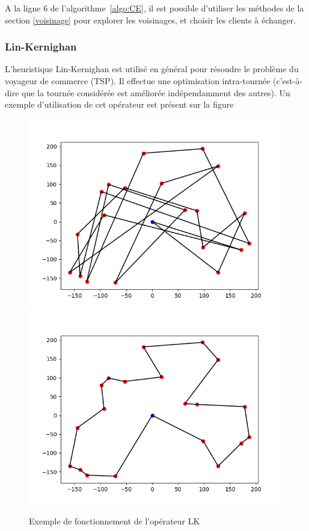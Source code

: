\documentclass[a4paper,11pt]{article}%
\begin{document}
A la ligne $6$ de l'algorithme~\ref{algo:CE}, il est possible d'utiliser les méthodes de la section \ref{voisinage} pour explorer les voisinages, et choisir les clients à échanger.

\subsubsection{Lin-Kernighan}

L'heuristique Lin-Kernighan est utilisé en général pour résoudre le problème du voyageur de commerce (TSP). Il effectue une optimisation intra-tournée (c'est-à-dire que la tournée considérée est améliorée indépendamment des autres). 
Un exemple d'utilisation de cet opérateur est présent sur la figure~

\begin{figure}
\centering
\includegraphics[scale=0.4]{test4_20_init.png}
\includegraphics[scale=0.4]{test4_20_LKopt.png}

\caption{Exemple de fonctionnement de l'opérateur LK}
\label{LK}
\end{figure}
\end{document}
